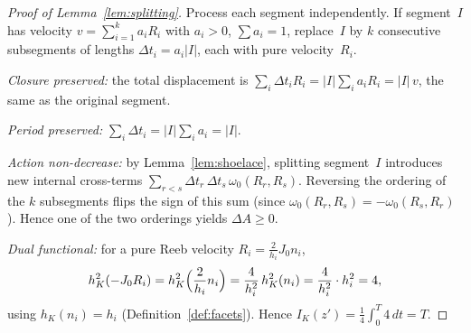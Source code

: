 \begin{proof}[Proof of Lemma~\ref{lem:splitting}]
Process each segment independently.
If segment~$I$ has velocity
$v = \sum_{i=1}^k a_i R_i$ with $a_i > 0$,
$\sum a_i = 1$,
replace~$I$ by $k$ consecutive subsegments of
lengths $\Delta t_i = a_i |I|$, each with pure
velocity~$R_i$.

\emph{Closure preserved:}
the total displacement is
$\sum_i \Delta t_i R_i
  = |I| \sum_i a_i R_i = |I|\, v$,
the same as the original segment.

\emph{Period preserved:}
$\sum_i \Delta t_i = |I| \sum_i a_i = |I|$.

\emph{Action non-decrease:}
by Lemma~\ref{lem:shoelace},
splitting segment~$I$ introduces
new internal cross-terms
$\sum_{r < s} \Delta t_r\, \Delta t_s\,
  \omega_0(R_r, R_s)$.
Reversing the ordering of the $k$ subsegments
flips the sign of this sum
(since $\omega_0(R_r, R_s) = -\omega_0(R_s, R_r)$).
Hence one of the two orderings yields
$\Delta A \geq 0$.

\emph{Dual functional:}
for a pure Reeb velocity
$R_i = \frac{2}{h_i} J_0 n_i$,
\[
  h_K^2(-J_0 R_i)
  = h_K^2\Bigl(\frac{2}{h_i} n_i\Bigr)
  = \frac{4}{h_i^2}\, h_K^2(n_i)
  = \frac{4}{h_i^2} \cdot h_i^2
  = 4,
\]
using $h_K(n_i) = h_i$
(Definition~\ref{def:facets}).
Hence
$I_K(z') = \frac{1}{4} \int_0^T 4\, dt = T$.
\end{proof}

